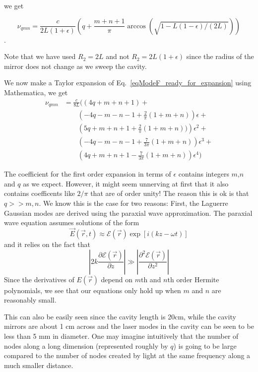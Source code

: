 we get 

\begin{equation} \label{eqModeF_ready_for_expansion}
\nu_{qmn}=\frac{c}{2L(1+\epsilon)}\left(q+\frac{m+n+1}{\pi}\arccos(\sqrt{1-L(1-\epsilon)/(2L)})\right)
\end{equation}.

Note that we have used $R_2=2L$ and not $R_2=2L(1+\epsilon)$ since the radius of the mirror does not change as we sweep the cavity. 

We now make a Taylor expansion of Eq.\ \ref{eqModeF_ready_for_expansion} using Mathematica, we get 
\begin{align*}
\nu_{qmn}&=\frac{c}{8L}\biggl((4q+m+n+1) +\\
& \quad \quad \left(-4q-m-n-1+\frac{2}{\pi}(1+m+n)\right)\epsilon+\\
& \quad \quad \left(5q+m+n+1+\frac{2}{\pi}(1+m+n))\right)\epsilon^2+\\
& \quad \quad \left(-4q-m-n-1+\frac{7}{3\pi}(1+m+n)\right)\epsilon^3+\\
& \quad \quad \left(4q+m+n+1-\frac{7}{3\pi}(1+m+n)\right)\epsilon^4
\biggr)
\end{align*}

The coefficient for the first order expansion in terms of $\epsilon$ contains integers $m$,$n$ and $q$ as we expect. 
However, it might seem unnerving at first that it also contains coefficents like $2/\pi$ that are of order unity! The reason this is ok is that $q>>m,n$. We know this is the case for two reasons: First, the Laguerre Gaussian modes are derived using the paraxial wave approximation. The paraxial wave equation assumes solutions of the form
\begin{equation}
\vec{E}(\vec{r},t)\approx \mathcal{E}(\vec{r})\exp[i(kz-\omega t)]
\end{equation}
and it relies on the fact that 
\begin{equation}
\left|2k\frac{\partial \mathcal{E}(\vec{r})}{\partial z}\right|\gg\left|\frac{\partial^2\mathcal{E}(\vec{r})}{\partial z^2}\right|
\end{equation}
Since the derivatives of $E(\vec{r})$ depend on $m$th and $n$th order Hermite polynomials, we see that our equations only hold up when $m$ and $n$ are reasonably small. 

This can also be easily seen since the cavity length is 20cm, while the cavity mirrors are about 1 cm across and the laser modes in the cavity can be seen to be less than 5 mm in diameter. One may imagine intuitively that the number of nodes along a long dimension (represented roughly by $q$) is going to be large compared to the number of nodes created by light at the same frequency along a much smaller distance. 

